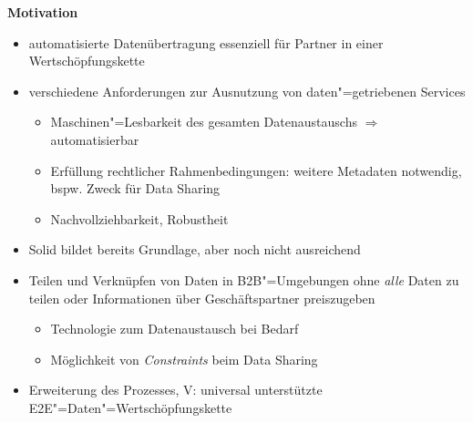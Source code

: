 \textbf{Motivation}~\cite{bothSolidBasedB2BData2025}
\begin{itemize}
    \item automatisierte Datenübertragung essenziell für Partner in einer Wertschöpfungskette
    \item verschiedene Anforderungen zur Ausnutzung von daten"=getriebenen Services
    \begin{itemize}
        \item Maschinen"=Lesbarkeit des gesamten Datenaustauschs $\Rightarrow$ automatisierbar
        \item Erfüllung rechtlicher Rahmenbedingungen: weitere Metadaten notwendig, bspw. Zweck für Data Sharing
        \item Nachvollziehbarkeit, Robustheit
    \end{itemize}
    \item Solid bildet bereits Grundlage, aber noch nicht ausreichend
    \item Teilen und Verknüpfen von Daten in B2B"=Umgebungen ohne \emph{alle} Daten zu teilen oder Informationen über Geschäftspartner preiszugeben
    \begin{itemize}
        \item Technologie zum Datenaustausch bei Bedarf
        \item Möglichkeit von \emph{Constraints} beim Data Sharing
    \end{itemize}
    \item Erweiterung des Prozesses, V: universal unterstützte E2E"=Daten"=Wertschöpfungskette
\end{itemize}

\vspace{1cm}

